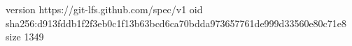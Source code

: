 version https://git-lfs.github.com/spec/v1
oid sha256:d913fddb1f2f3eb0c1f13b63bcd6ca70bdda973657761de999d33560e80c71e8
size 1349
